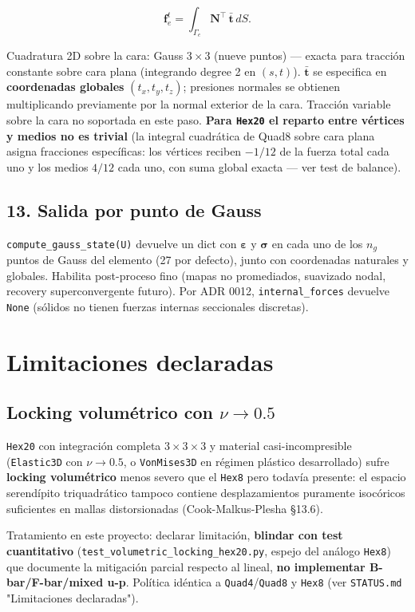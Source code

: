 \documentclass[11pt,letterpaper,oneside]{report}
\begin{document}
\[
\mathbf f_e^{t} = \int_{\Gamma_e} \mathbf N^\top\,\bar{\mathbf t}\, dS.
\]

Cuadratura 2D sobre la cara: Gauss $3 \times 3$ (nueve puntos) --- exacta para tracción constante sobre cara plana (integrando degree 2 en $(s,t)$). $\bar{\mathbf t}$ se especifica en \textbf{coordenadas globales} $(t_x, t_y, t_z)$; presiones normales se obtienen multiplicando previamente por la normal exterior de la cara. Tracción variable sobre la cara no soportada en este paso. \textbf{Para \texttt{Hex20} el reparto entre vértices y medios no es trivial} (la integral cuadrática de Quad8 sobre cara plana asigna fracciones específicas: los vértices reciben $-1/12$ de la fuerza total cada uno y los medios $4/12$ cada uno, con suma global exacta --- ver test de balance).

\subsection{13. Salida por punto de Gauss}

\texttt{compute\_gauss\_state(U)} devuelve un dict con $\boldsymbol\varepsilon$ y $\boldsymbol\sigma$ en cada uno de los $n_g$ puntos de Gauss del elemento (27 por defecto), junto con coordenadas naturales y globales. Habilita post-proceso fino (mapas no promediados, suavizado nodal, recovery superconvergente futuro). Por ADR 0012, \texttt{internal\_forces} devuelve \texttt{None} (sólidos no tienen fuerzas internas seccionales discretas).


\section{Limitaciones declaradas}

\subsection{Locking volumétrico con $\nu \to 0.5$}

\texttt{Hex20} con integración completa $3\times 3\times 3$ y material casi-incompresible (\texttt{Elastic3D} con $\nu \to 0.5$, o \texttt{VonMises3D} en régimen plástico desarrollado) sufre \textbf{locking volumétrico} menos severo que el \texttt{Hex8} pero todavía presente: el espacio serendípito triquadrático tampoco contiene desplazamientos puramente isocóricos suficientes en mallas distorsionadas (Cook-Malkus-Plesha §13.6). 

Tratamiento en este proyecto: declarar limitación, \textbf{blindar con test cuantitativo} (\texttt{test\_volumetric\_locking\_hex20.py}, espejo del análogo \texttt{Hex8}) que documente la mitigación parcial respecto al lineal, \textbf{no implementar B-bar/F-bar/mixed u-p}. Política idéntica a \texttt{Quad4}/\texttt{Quad8} y \texttt{Hex8} (ver \texttt{STATUS.md} "Limitaciones declaradas").
\end{document}
